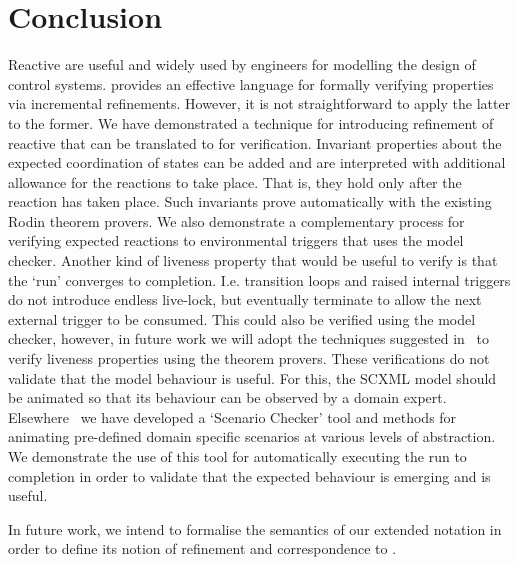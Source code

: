 \section{Conclusion}
\label{sec:conc}

Reactive \SCs are useful and widely used by engineers for modelling the design of control systems. 
\EventB provides an effective language for formally verifying properties via incremental refinements.
However, it is not straightforward to apply the latter to the former.
We have demonstrated a technique for introducing refinement of reactive \SCs that can be translated to \EventB for verification.
Invariant properties about the expected coordination of states can be added and are interpreted with additional allowance for the reactions to take place.
That is, they hold only after the reaction has taken place.
Such invariants prove automatically with the existing Rodin theorem provers.
We also demonstrate a complementary process for verifying expected reactions to environmental triggers that uses the \LTL model checker.
Another kind of liveness property that would be useful to verify is that the `run' converges to completion.
I.e. transition loops and raised internal triggers do not introduce endless live-lock, but eventually terminate to allow the next external trigger to be consumed.
This could also be verified using the \LTL model checker, however, in future work we will adopt the techniques suggested in~\cite{hudon16:_unit_b_method} to verify liveness properties using the theorem provers.
These verifications do not validate that the model behaviour is useful.
For this, the SCXML model should be animated so that its behaviour can be observed by a domain expert.
Elsewhere~\cite{snook20JSA} we have developed a `Scenario Checker' tool and methods for animating pre-defined domain specific scenarios at various levels of abstraction.
We demonstrate the use of this tool for automatically executing the run to completion in order to validate that the expected behaviour is emerging and is useful.

In future work, we intend to formalise the semantics of our extended \SCXML notation in order to define its notion of refinement and correspondence to \EventB. 



